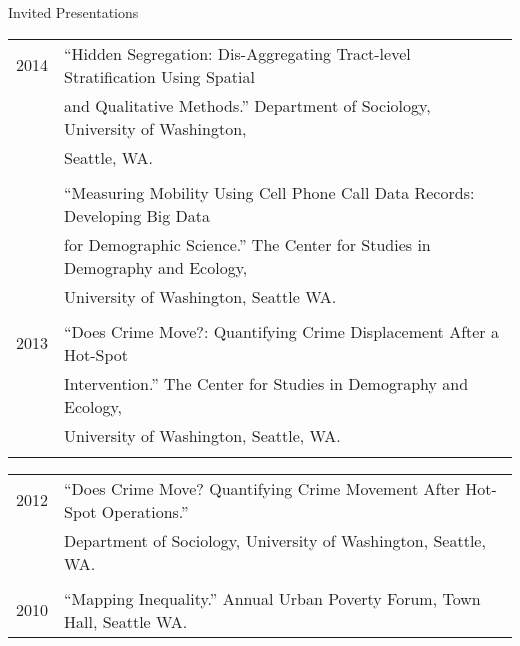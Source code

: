 \documentclass{resume} %
\begin{document}
\begin{rSection}{Invited Presentations}
\begin{tabular}{ @{} >{}l @{\hspace{6ex}} l }
2014	& ``Hidden Segregation: Dis-Aggregating Tract-level Stratification Using Spatial\\
		& and Qualitative Methods.'' Department of Sociology, University of Washington, \\
		& Seattle, WA.\\\\

		& ``Measuring Mobility Using Cell Phone Call Data Records: Developing Big Data\\
		& for Demographic Science.'' The Center for Studies in Demography and Ecology, \\
		& University of Washington, Seattle WA.\\\\

2013	& ``Does Crime Move?: Quantifying Crime Displacement After a Hot-Spot\\
		& Intervention.'' The Center for Studies in Demography and Ecology, \\
		& University of Washington, Seattle, WA.\\\\
\end{tabular}

\begin{tabular}{ @{} >{}l @{\hspace{6ex}} l }
2012	& ``Does Crime Move? Quantifying Crime Movement After Hot-Spot Operations.''\\
		& Department of Sociology, University of Washington, Seattle, WA.\\\\

2010 	& ``Mapping Inequality.'' Annual Urban Poverty Forum, Town Hall, Seattle WA.
\end{tabular}
\vspace{5mm}
\end{rSection}

%
%
\end{document}
